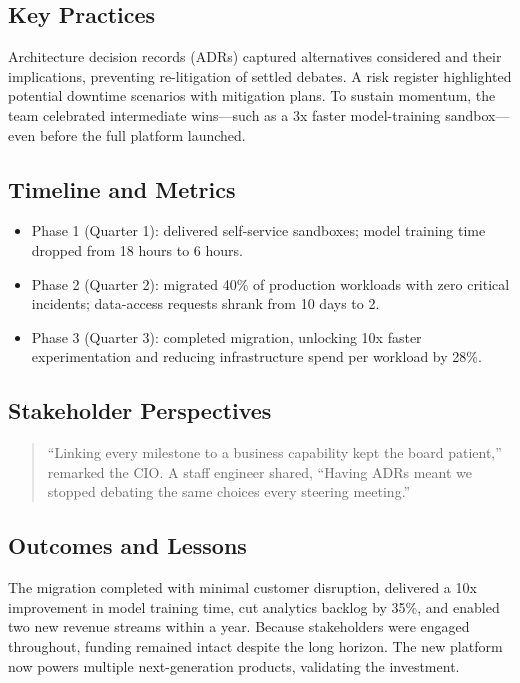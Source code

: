 \subsection{Key Practices}
Architecture decision records (ADRs) captured alternatives considered and their implications, preventing re-litigation of settled debates. A risk register highlighted potential downtime scenarios with mitigation plans. To sustain momentum, the team celebrated intermediate wins—such as a 3x faster model-training sandbox—even before the full platform launched.

\subsection{Timeline and Metrics}
\begin{itemize}
    \item Phase 1 (Quarter 1): delivered self-service sandboxes; model training time dropped from 18 hours to 6 hours.
    \item Phase 2 (Quarter 2): migrated 40\% of production workloads with zero critical incidents; data-access requests shrank from 10 days to 2.
    \item Phase 3 (Quarter 3): completed migration, unlocking 10x faster experimentation and reducing infrastructure spend per workload by 28\%.
\end{itemize}

\subsection{Stakeholder Perspectives}
\begin{quote}
``Linking every milestone to a business capability kept the board patient,'' remarked the CIO. A staff engineer shared, ``Having ADRs meant we stopped debating the same choices every steering meeting.''
\end{quote}

\subsection{Outcomes and Lessons}
The migration completed with minimal customer disruption, delivered a 10x improvement in model training time, cut analytics backlog by 35\%, and enabled two new revenue streams within a year. Because stakeholders were engaged throughout, funding remained intact despite the long horizon. The new platform now powers multiple next-generation products, validating the investment.

